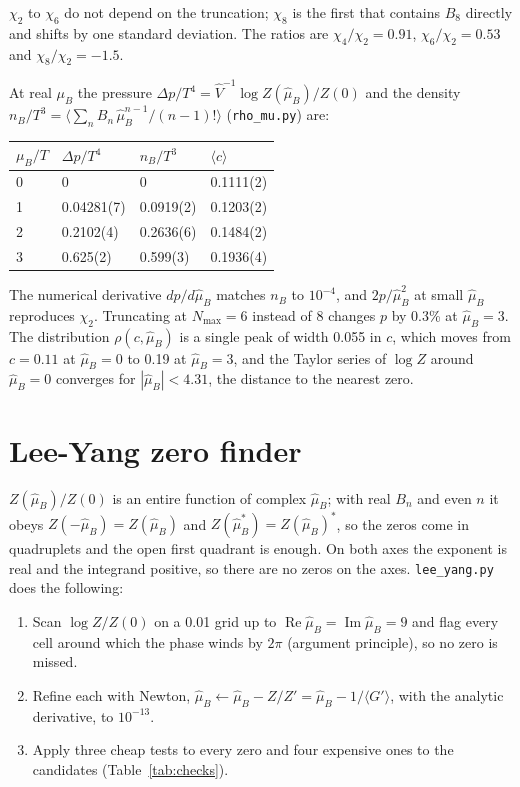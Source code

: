 \documentclass[11pt,a4paper]{article}
\newcommand{\muB}{\mu_B}
\newcommand{\hmu}{\hat{\mu}_B}
\newcommand{\hV}{\hat{V}}
\newcommand{\Nmax}{N_{\max}}
\newcommand{\code}[1]{\texttt{#1}}
\begin{document}
$\chi_2$ to $\chi_6$ do not depend on the truncation; $\chi_8$ is the first that contains $B_8$ directly and shifts by one standard deviation. The ratios are $\chi_4/\chi_2=0.91$, $\chi_6/\chi_2=0.53$ and $\chi_8/\chi_2=-1.5$.

At real $\muB$ the pressure $\Delta p/T^4=\hV^{-1}\log Z(\hmu)/Z(0)$ and the density $n_B/T^3=\langle\sum_n B_n\,\hmu^{n-1}/(n-1)!\rangle$ (\code{rho\_mu.py}) are:

\begin{center}\small
\begin{tabular}{llll}
\toprule
$\muB/T$ & $\Delta p/T^4$ & $n_B/T^3$ & $\langle c\rangle$ \\
\midrule
0 & 0 & 0 & 0.1111(2) \\
1 & 0.04281(7) & 0.0919(2) & 0.1203(2) \\
2 & 0.2102(4) & 0.2636(6) & 0.1484(2) \\
3 & 0.625(2) & 0.599(3) & 0.1936(4) \\
\bottomrule
\end{tabular}
\end{center}

The numerical derivative $dp/d\hmu$ matches $n_B$ to $10^{-4}$, and $2p/\hmu^2$ at small $\hmu$ reproduces $\chi_2$. Truncating at $\Nmax=6$ instead of 8 changes $p$ by 0.3\% at $\hmu=3$. The distribution $\rho(c,\hmu)$ is a single peak of width 0.055 in $c$, which moves from $c=0.11$ at $\hmu=0$ to 0.19 at $\hmu=3$, and the Taylor series of $\log Z$ around $\hmu=0$ converges for $|\hmu|<4.31$, the distance to the nearest zero.

\section{Lee-Yang zero finder}

$Z(\hmu)/Z(0)$ is an entire function of complex $\hmu$; with real $B_n$ and even $n$ it obeys $Z(-\hmu)=Z(\hmu)$ and $Z(\hmu^*)=Z(\hmu)^*$, so the zeros come in quadruplets and the open first quadrant is enough. On both axes the exponent is real and the integrand positive, so there are no zeros on the axes. \code{lee\_yang.py} does the following:
\begin{enumerate}[nosep]
\item Scan $\log Z/Z(0)$ on a 0.01 grid up to $\operatorname{Re}\hmu=\operatorname{Im}\hmu=9$ and flag every cell around which the phase winds by $2\pi$ (argument principle), so no zero is missed.
\item Refine each with Newton, $\hmu\leftarrow\hmu-Z/Z'=\hmu-1/\langle G'\rangle$, with the analytic derivative, to $10^{-13}$.
\item Apply three cheap tests to every zero and four expensive ones to the candidates (Table~\ref{tab:checks}).
\end{enumerate}
\end{document}
